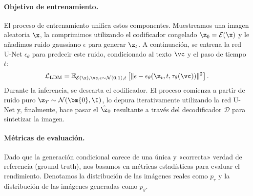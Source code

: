\documentclass[../../book-main_es.tex]{subfiles}
\begin{document}
\paragraph{Objetivo de entrenamiento.}
El proceso de entrenamiento unifica estos componentes. Muestreamos una imagen aleatoria $\x$, la 
comprimimos utilizando el codificador congelado $\z_0 = \mathcal{E}(\x)$ y le añadimos ruido 
gaussiano $\epsilon$ para generar $\z_t$. A continuación, se entrena la red U-Net $\epsilon_\theta$ 
para predecir este ruido, condicionado al texto $\vc$ y el paso de tiempo $t$:
\begin{equation}
\mathcal{L}_{\text{LDM}} = \mathbb{E}_{\mathcal{E}(\x), \vc, \epsilon \sim \mathcal{N}(0,1), t} \left[ \| \epsilon - \epsilon_\theta(\z_t, t, \tau_\theta(\vc)) \|^2 \right].
\end{equation}
Durante la inferencia, se descarta el codificador. El proceso comienza a partir de ruido puro 
$\z_T \sim \mathcal{N}(\bm{0}, \I)$, lo depura iterativamente utilizando la red U-Net y, finalmente, 
hace pasar el $\hat{\z}_0$ resultante a través del decodificador $\mathcal{D}$ para sintetizar la imagen.

\paragraph{Métricas de evaluación.}
Dado que la generación condicional carece de una única y «correcta» verdad de referencia (ground truth), nos basamos en 
métricas estadísticas para evaluar el rendimiento. Denotamos la distribución de las imágenes reales 
como $p_r$ y la distribución de las imágenes generadas como $p_g$.
\end{document}

